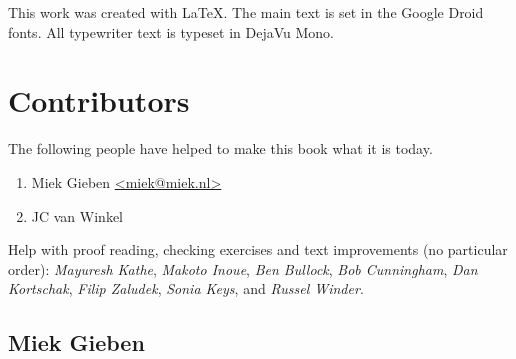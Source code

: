 \noindent{}This work was created with \LaTeX. The main text is set in
the Google Droid fonts. All typewriter text is typeset in DejaVu Mono.

\section{Contributors}
The following people have helped to make this book what it is today.
\begin{enumerate}
\item{Miek Gieben \qquad\url{<miek@miek.nl>}}
\item{JC van Winkel}
\end{enumerate}

Help with proof reading, checking exercises and text improvements (no
particular order):
\emph{Mayuresh Kathe},
\emph{Makoto Inoue},
\emph{Ben Bullock},
\emph{Bob Cunningham},
\emph{Dan Kortschak},
\emph{Filip Zaludek},
\emph{Sonia Keys},
and \emph{Russel Winder}.

\subsection{Miek Gieben}

